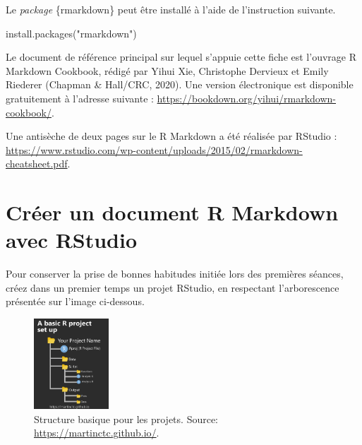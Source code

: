 \documentclass[
  11pt,
]{book}
\newenvironment{Shaded}{\begin{snugshade}}{\end{snugshade}}
\newcommand{\FunctionTok}[1]{\textcolor[rgb]{0.00,0.00,0.00}{#1}}
\newcommand{\NormalTok}[1]{#1}
\newcommand{\StringTok}[1]{\textcolor[rgb]{0.31,0.60,0.02}{#1}}
\numberwithin{equation}{section}
\numberwithin{countremarque}{section}
\begin{document}
Le \emph{package} \{rmarkdown\} peut être installé à l'aide de l'instruction suivante.

\begin{Shaded}
\begin{Highlighting}[]
\FunctionTok{install.packages}\NormalTok{(}\StringTok{"rmarkdown"}\NormalTok{)}
\end{Highlighting}
\end{Shaded}

Le document de référence principal sur lequel s'appuie cette fiche est l'ouvrage R Markdown Cookbook, rédigé par Yihui Xie, Christophe Dervieux et Emily Riederer (Chapman \& Hall/CRC, 2020). Une version électronique est disponible gratuitement à l'adresse suivante : \url{https://bookdown.org/yihui/rmarkdown-cookbook/}.

Une antisèche de deux pages sur le R Markdown a été réalisée par RStudio : \url{https://www.rstudio.com/wp-content/uploads/2015/02/rmarkdown-cheatsheet.pdf}.

\hypertarget{cruxe9er-un-document-r-markdown-avec-rstudio}{%
\section{Créer un document R Markdown avec RStudio}\label{cruxe9er-un-document-r-markdown-avec-rstudio}}

Pour conserver la prise de bonnes habitudes initiée lors des premières séances, créez dans un premier temps un projet RStudio, en respectant l'arborescence présentée sur l'image ci-dessous.

\begin{figure}
\centering
\includegraphics[width=0.25\textwidth,height=\textheight]{figs/project_tree_structure.png}
\caption{Structure basique pour les projets. Source: \url{https://martinctc.github.io/}.}
\end{figure}
\end{document}

